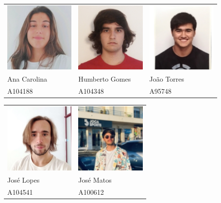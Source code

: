 \documentclass[12pt, a4paper]{article}
\begin{document}
\vspace{2cm}
\begin{center}
    \begin{tabular}{>{\centering}p{}
                    >{\centering}p{}
                    >{\centering\arraybackslash}p{}}
        \includegraphics[width=3.5cm]{Imagens/Capa/A104188.png} &
        \includegraphics[width=3.5cm]{Imagens/Capa/A104348.png} &
        \includegraphics[width=3.5cm]{Imagens/Capa/A95748.png}  \\

        Ana Carolina & Humberto Gomes & João Torres \\
        A104188      & A104348        & A95748
    \end{tabular}

    \begin{tabular}{>{\centering}p{}
                    >{\centering\arraybackslash}p{}}
        \includegraphics[width=3.5cm]{Imagens/Capa/A104541.png} &
        \includegraphics[width=3.5cm]{Imagens/Capa/A100612.png} \\

        José Lopes & José Matos \\
        A104541    & A100612
    \end{tabular}
\end{center}
\end{document}
